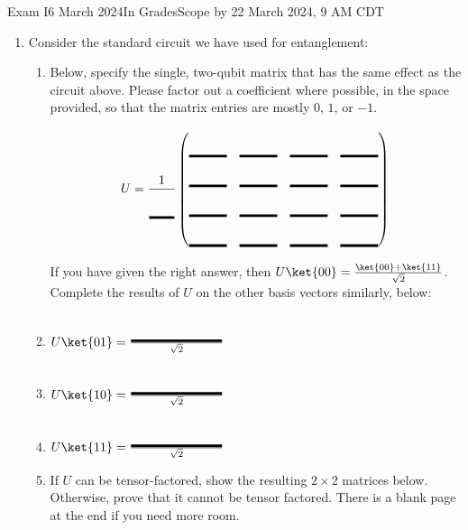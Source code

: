 \documentclass[12pt]{article}
\newcommand{\Blank}[1][1in]{\mbox{\vrule width #1 depth 2pt}\vrule width 0pt height 2.0em}
\def\EmptyFourByFour{%
\frac{1}{\Blank[2em]} \begin{pmatrix*}[r]
 \Blank[3em]{} & \Blank[3em]{} & \Blank[3em]{} & \Blank[3em]{} \\
 \Blank[3em]{} & \Blank[3em]{} & \Blank[3em]{} & \Blank[3em]{} \\
 \Blank[3em]{} & \Blank[3em]{} & \Blank[3em]{} & \Blank[3em]{} \\
 \Blank[3em]{} & \Blank[3em]{} & \Blank[3em]{} & \Blank[3em]{}\end{pmatrix*}}
\begin{document}
\begin{assignment}{Exam I}{6 March 2024}{In GradesScope by 22 March 2024, 9 AM CDT}
\begin{enumerate}
\begin{enumerate}
Applying a Hadamard to each state of $\ket{\psi_{abe}}$ produces:
\[
\ket{\psi_{xxx}} = \frac{1}{\Blank[2em]}\begin{pmatrix*}
\Blank[2em] \\
\Blank[2em] \\
\Blank[2em] \\
\Blank[2em] \\
\Blank[2em] \\
\Blank[2em] \\
\Blank[2em] \\
\Blank[2em] 
\end{pmatrix*}
\]
\item{} What are the possible
outcomes for Alice's and Bob's measurements of $\ket{\psi_{xxx}}$ in
the computational basis?

\item{} How can Alice and Bob catch Eve's presence in
$\ket{\psi_{abe}}$ now?
\end{enumerate}




\clearpage\item{} Consider the standard circuit we have used for
entanglement:
\begin{center}   
    \end{center}
\begin{enumerate}
\item{}
Below, specify the single, two-qubit matrix that has the same effect as
the circuit above.  Please factor out a coefficient where possible, in
the space provided,  so that
the matrix entries are mostly $0$, $1$, or $-1$.

{\small
\[
U = \EmptyFourByFour{} \]}

If you have given the right answer, then $U\ket{00}=\frac{\ket{00}+\ket{11}}{\sqrt{2}}$.  Complete the results of $U$ on the other basis vectors similarly, below:

\item{} $U\ket{01}=\frac{\Blank{}}{\sqrt{2}}$
\item{} $U\ket{10}=\frac{\Blank{}}{\sqrt{2}}$
\item{} $U\ket{11}=\frac{\Blank{}}{\sqrt{2}}$
\item{} If $U$ can be tensor-factored, show the resulting $2\times 2$ matrices below. Otherwise, prove that it cannot be tensor factored. There is a blank page at the end if you need more room.
\end{enumerate}







\end{enumerate}
\end{assignment}
\end{document}
